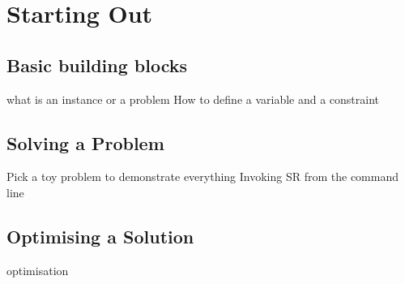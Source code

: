 \section{Starting Out}
\subsection{Basic building blocks}
 what is an instance or a problem
How to define a variable and a constraint

\subsection{Solving a Problem}
Pick a toy problem to demonstrate everything
Invoking SR from the command line

\subsection{Optimising a Solution}
optimisation
